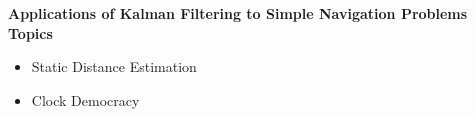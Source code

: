 \begin{frame}
\textbf{Applications of Kalman Filtering to Simple 
Navigation Problems\\
Topics}
 \begin{itemize}
 \item Static Distance Estimation
 \item Clock Democracy
\end{itemize}
\end{frame}


